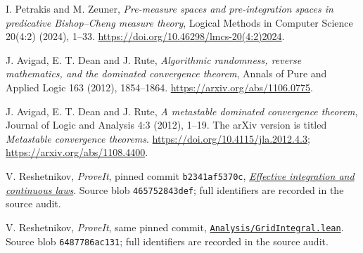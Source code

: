 I. Petrakis and M. Zeuner,
\emph{Pre-measure spaces and pre-integration spaces in predicative
Bishop--Cheng measure theory}, Logical Methods in Computer Science
20(4:2) (2024), 1--33.
\url{https://doi.org/10.46298/lmcs-20(4:2)2024}.

J. Avigad, E. T. Dean and J. Rute,
\emph{Algorithmic randomness, reverse mathematics, and the dominated
convergence theorem}, Annals of Pure and Applied Logic 163 (2012), 1854--1864.
\url{https://arxiv.org/abs/1106.0775}.

J. Avigad, E. T. Dean and J. Rute,
\emph{A metastable dominated convergence theorem}, Journal of Logic and
Analysis 4:3 (2012), 1--19.
The arXiv version is titled \emph{Metastable convergence theorems}.
\url{https://doi.org/10.4115/jla.2012.4.3};
\url{https://arxiv.org/abs/1108.4400}.

V. Reshetnikov, \emph{ProveIt}, pinned commit \texttt{b2341af5370c},
\href{https://github.com/VladimirReshetnikov/ProveIt/blob/b2341af5370cd8a43f72ebb2341c0d7d7395b634/Logic/PrimitiveRecursiveArithmetic/docs/proofs/probability/expected_value_ipra_2026-11-16/paper/sections/10_effective_integration.tex}{\emph{Effective integration and continuous laws}}.
Source blob \texttt{465752843def}; full identifiers are recorded in the
source audit.

V. Reshetnikov, \emph{ProveIt}, same pinned commit,
\href{https://github.com/VladimirReshetnikov/ProveIt/blob/b2341af5370cd8a43f72ebb2341c0d7d7395b634/Logic/PrimitiveRecursiveArithmetic/Derivations/Lean/IPRADerivations/Analysis/GridIntegral.lean}{\texttt{Analysis/GridIntegral.lean}}.
Source blob \texttt{6487786ac131}; full identifiers are recorded in the
source audit.
